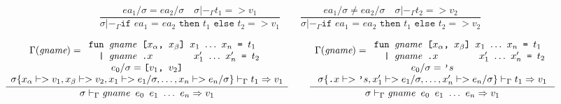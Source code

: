 \documentclass[10pt]{../sigplanconf}
\newcommand{\nfrac}[2]{\frac{\displaystyle{#1}}{\displaystyle{#2}}}
\newcommand{\tagsc}[1]{\tag{\scshape #1}}
\begin{document}
\begin{figure}\centering
  \begin{equation}
    \nfrac{
      ea_1/ \sigma = ea_2/\sigma \quad
      \sigma |-_\Gamma t_1 => v_1
    }{
      \sigma |-_\Gamma \texttt{if $ea_1$ = $ea_2$ then $t_1$ else $t_2$} => v_1
    }
    \qquad
    \nfrac{
      ea_1/ \sigma \neq ea_2/\sigma \quad
      \sigma |-_\Gamma t_2 => v_2
    }{
      \sigma |-_\Gamma \texttt{if $ea_1$ = $ea_2$ then $t_1$ else $t_2$} => v_2
    } \tagsc{If}
\end{equation}

\begin{equation}
\hspace{-0.7cm}
  \nfrac{
    \begin{array}{c}
      \Gamma(\textit{gname}) =
      \begin{array}{l}
        \texttt{fun \textit{\rmfamily gname} [$x_\alpha$, $x_\beta$] $x_1$ $\ldots$ $x_n$ = $t_1$} \\
        \texttt{\ \ | \textit{\rmfamily gname}\ \texttt{.}$x$ \hspace{1.1cm} $x_1'$ $\ldots$ $x_n'$ = $t_2$} \\
      \end{array} \\
      e_0/\sigma = \texttt{[$v_1$, $v_2$]} \\
      \sigma\{x_\alpha |-> v_1, x_\beta |-> v_2, x_1 |-> e_1/\sigma, \ldots, x_n |-> e_n/\sigma\} |-_\Gamma t_1 => v_1
    \end{array}
  }{
    \sigma |-_\Gamma \texttt{\textit{\rmfamily gname} $e_0$ $e_1$ $\ldots$ $e_n$} => v_1
  }
\qquad
  \nfrac{
    \begin{array}{c}
      \Gamma(\textit{gname}) =
      \begin{array}{l}
        \texttt{fun \textit{\rmfamily gname} [$x_\alpha$, $x_\beta$] $x_1$ $\ldots$ $x_n$ = $t_1$} \\
        \texttt{\ \ | \textit{\rmfamily gname}\ \texttt{.}$x$ \hspace{1.1cm} $x_1'$ $\ldots$ $x_n'$ = $t_2$} \\
      \end{array} \\
      e_0/\sigma = \texttt{'}s \\
      \sigma\{\texttt{.}x |-> \texttt{'}s, x_1' |-> e_1/\sigma, \ldots, x_n' |-> e_n/\sigma\} |-_\Gamma t_1 => v_1
    \end{array}
  }{
    \sigma |-_\Gamma \texttt{\textit{\rmfamily gname} $e_0$ $e_1$ $\ldots$ $e_n$} => v_1
}
\end{equation}
\end{figure}
\end{document}
